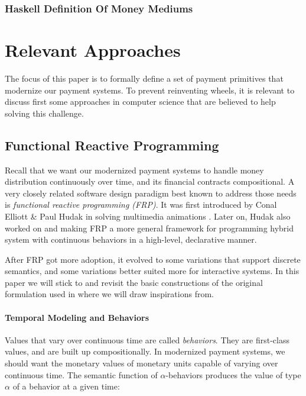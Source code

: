\subsubsection{Haskell Definition Of Money Mediums}



\section{Relevant Approaches}

The focus of this paper is to formally define a set of payment primitives that modernize our payment
systems. To prevent reinventing wheels, it is relevant to discuss first some approaches in computer
science that are believed to help solving this challenge.

\subsection{Functional Reactive Programming}

Recall that we want our modernized payment systems to handle money distribution continuously over
time, and its financial contracts compositional. A very closely related software design paradigm
best known to address those needs is \textit{functional reactive programming (FRP)}.  It was first
introduced by Conal Elliott \& Paul Hudak in solving multimedia
animations \cite{elliott1997functional}. Later on, Hudak also worked on \cite{hudak2002arrows} and
\cite{wan2000functional} making FRP a more general framework for programming hybrid system with
continuous behaviors in a high-level, declarative manner.

After FRP got more adoption, it evolved to some variations that support discrete semantics, and some
variations better suited more for interactive systems. In this paper we will stick to and revisit
the basic constructions of the original formulation used in \cite{elliott1997functional} where we
will draw inspirations from.

\paragraph{Temporal Modeling and Behaviors}

Values that vary over continuous time are called \textit{behaviors}. They are first-class values,
and are built up compositionally. In modernized payment systems, we should want the monetary values
of monetary units capable of varying over continuous time. The semantic function of
$\alpha$-behaviors produces the value of type $\alpha$ of a behavior at a given time:

